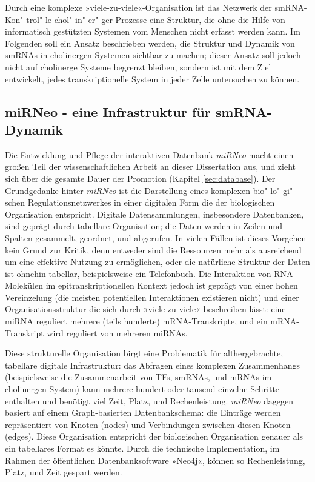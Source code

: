 Durch eine komplexe »viele-zu-viele«-Organisation ist das Netzwerk der smRNA-Kon"-trol"-le chol"-in"-er"-ger Prozesse eine Struktur, die ohne die Hilfe von informatisch gestützten Systemen vom Menschen nicht erfasst werden kann. Im Folgenden soll ein Ansatz beschrieben werden, die Struktur und Dynamik von smRNAs in cholinergen Systemen sichtbar zu machen; dieser Ansatz soll jedoch nicht auf cholinerge Systeme begrenzt bleiben, sondern ist mit dem Ziel entwickelt, jedes transkriptionelle System in jeder Zelle untersuchen zu können.

\subsection{miRNeo - eine Infrastruktur für smRNA-Dynamik}
Die Entwicklung und Pflege der interaktiven Datenbank \emph{miRNeo} macht einen großen Teil der wissenschaftlichen Arbeit an dieser Dissertation aus, und zieht sich über die gesamte Dauer der Promotion (Kapitel \ref{sec:database}). Der Grundgedanke hinter \emph{miRNeo} ist die Darstellung eines komplexen bio"-lo"-gi"-schen Regulationsnetzwerkes in einer digitalen Form die der biologischen Organisation entspricht. Digitale Datensammlungen, insbesondere Datenbanken, sind geprägt durch tabellare Organisation; die Daten werden in Zeilen und Spalten gesammelt, geordnet, und abgerufen. In vielen Fällen ist dieses Vorgehen kein Grund zur Kritik, denn entweder sind die Ressourcen mehr als ausreichend um eine effektive Nutzung zu ermöglichen, oder die natürliche Struktur der Daten ist ohnehin tabellar, beispielsweise ein Telefonbuch. Die Interaktion von RNA-Molekülen im epitranskriptionellen Kontext jedoch ist geprägt von einer hohen Vereinzelung (die meisten potentiellen Interaktionen existieren nicht) und einer Organisationsstruktur die sich durch »viele-zu-viele« beschreiben lässt: eine miRNA reguliert mehrere (teils hunderte) mRNA-Transkripte, und ein mRNA-Transkript wird reguliert von mehreren miRNAs.

Diese strukturelle Organisation birgt eine Problematik für althergebrachte, tabellare digitale Infrastruktur: das Abfragen eines komplexen Zusammenhangs (beispielsweise die Zusammenarbeit von TFs, smRNAs, und mRNAs im cholinergen System) kann mehrere hundert oder tausend einzelne Schritte enthalten und benötigt viel Zeit, Platz, und Rechenleistung. \emph{miRNeo} dagegen basiert auf einem Graph-basierten Datenbankschema: die Einträge werden repräsentiert von Knoten (nodes) und Verbindungen zwischen diesen Knoten (edges). Diese Organisation entspricht der biologischen Organisation genauer als ein tabellares Format es könnte. Durch die technische Implementation, im Rahmen der öffentlichen Datenbanksoftware »Neo4j«, können so Rechenleistung, Platz, und Zeit gespart werden.

